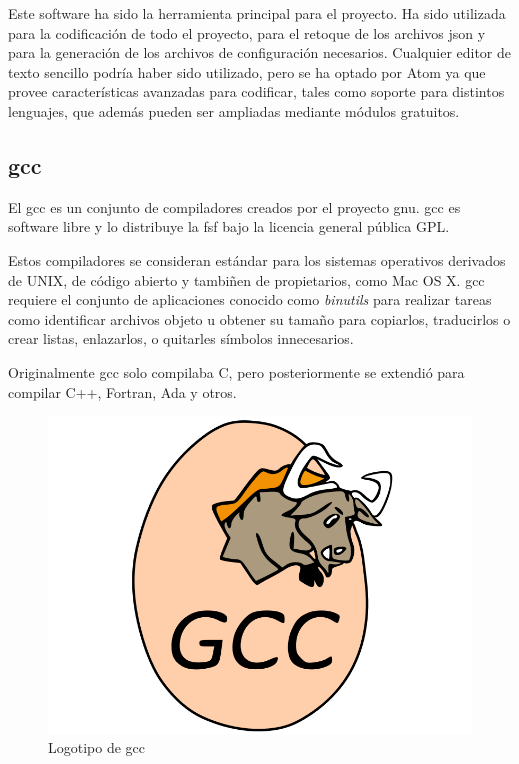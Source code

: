 		Este software ha sido la herramienta principal para el proyecto. Ha sido utilizada para la codificación de todo el proyecto, para el retoque de los archivos \acrshort{json} y para la generación de los archivos de configuración necesarios. Cualquier editor de texto sencillo podría haber sido utilizado, pero se ha optado por Atom ya que provee características avanzadas para codificar, tales como soporte para distintos lenguajes, que además pueden ser ampliadas mediante módulos gratuitos.

	\subsection{\acrlong{gcc}}

		El \acrfull{gcc} es un conjunto de compiladores creados por el proyecto \acrshort{gnu}. \acrshort{gcc} es software libre y lo distribuye la \acrshort{fsf} bajo la licencia general pública GPL.

		Estos compiladores se consideran estándar para los sistemas operativos derivados de UNIX, de código abierto y tambiñen de propietarios, como Mac OS X. \acrshort{gcc} requiere el conjunto de aplicaciones conocido como \textit{binutils} para realizar tareas como identificar archivos objeto u obtener su tamaño para copiarlos, traducirlos o crear listas, enlazarlos, o quitarles símbolos innecesarios.

		Originalmente \acrshort{gcc} solo compilaba C, pero posteriormente se extendió para compilar C++, Fortran, Ada y otros.

		\begin{figure}[!htp]
			 \centering
			 \includegraphics{fig/gcc}
			 \caption{Logotipo de \acrshort{gcc}}
			 \label{fig:gcc}
		\end{figure}

